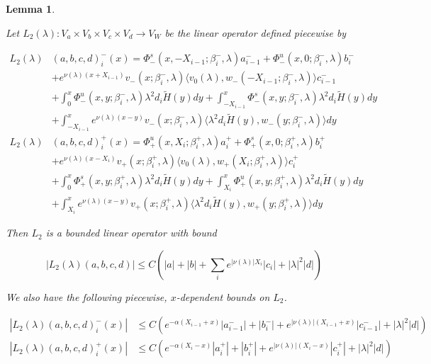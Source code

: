 \documentclass[12pt]{article}
\newtheorem{lemma}{Lemma}
\begin{document}

\begin{lemma}\label{L2}

Let $L_2(\lambda): V_a \times V_b \times V_c \times V_d \rightarrow V_W$ be the linear operator defined piecewise by

\begin{align*}
L_2(\lambda)&(a,b,c,d)_i^-(x) = \Phi^s_-(x, -X_{i-1}; \beta_i^-, \lambda)a_{i-1}^- + \Phi^u_-(x, 0; \beta_i^-, \lambda)b_i^- \\
&+ e^{\nu(\lambda)(x+X_{i-1})} v_-(x; \beta_i^-, \lambda) \langle v_0(\lambda), w_-(-X_{i-1}; \beta_i^-, \lambda) \rangle c_{i-1}^- \\
&+ \int_0^x \Phi^u_-(x, y; \beta_i^-, \lambda)\lambda^2 d_i \tilde{H}(y) dy + \int_{-X_{i-1}}^x \Phi^s_-(x, y; \beta_i^-, \lambda) \lambda^2 d_i \tilde{H}(y) dy \\
&+ \int_{-X_{i-1}}^x
e^{\nu(\lambda)(x-y)} v_-(x; \beta_i^-, \lambda) \langle \lambda^2 d_i \tilde{H}(y), w_-(y; \beta_i^-, \lambda) \rangle dy \\
L_2(\lambda)&(a,b,c,d)_i^+(x) = \Phi^u_+(x, X_i; \beta_i^+, \lambda)a_i^+ + \Phi^s_+(x, 0; \beta_i^+, \lambda)b_i^+ \\
&+ e^{\nu(\lambda)(x - X_i)} v_+(x; \beta_i^+, \lambda) \langle v_0(\lambda), w_+(X_i; \beta_i^+, \lambda) \rangle c_i^+ \\
&+ \int_0^x \Phi^s_+(x, y; \beta_i^+, \lambda) \lambda^2 d_i \tilde{H}(y) dy + \int_{X_i}^x \Phi^u_+(x, y; \beta_i^+, \lambda) \lambda^2 d_i \tilde{H}(y) dy \\
&+ \int_{X_i}^x e^{\nu(\lambda)(x-y)} v_+(x; \beta_i^+, \lambda) \langle \lambda^2 d_i \tilde{H}(y), w_+(y; \beta_i^+, \lambda) \rangle dy
\end{align*}

Then $L_2$ is a bounded linear operator with bound

\begin{equation}\label{L2bound}
|L_2(\lambda)(a,b,c,d)| \leq C \left( |a| + |b| + \sum_i e^{|\nu(\lambda)|X_i}|c_i| + |\lambda|^2 |d| \right)
\end{equation}

We also have the following piecewise, $x$-dependent bounds on $L_2$.

\begin{align*}
|L_2(\lambda)(a,b,c,d)_i^-(x)| &\leq C (e^{-\alpha(X_{i-1} + x)}|a_{i-1}^-| + |b_i^-| + e^{|\nu(\lambda)|(X_{i-1} + x)} |c_{i-1}^-| + |\lambda|^2 |d| ) \\
|L_2(\lambda)(a,b,c,d)_i^+(x)| &\leq C (e^{-\alpha(X_i - x)}|a_i^+| + |b_i^+| + e^{|\nu(\lambda)|(X_i - x)} |c_i^+| + |\lambda|^2 |d| ) 
\end{align*}


\end{lemma}
\end{document}
